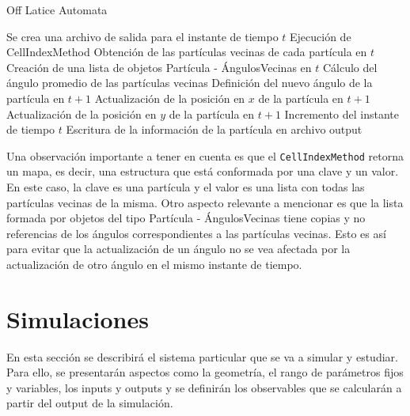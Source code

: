 \documentclass[11pt]{article}
\begin{document}
            \begin{algorithm}
                \caption{Off Latice Automata}
                \begin{algorithmic}[1]
                    \State Se crea una archivo de salida para el instante de tiempo $t$
                            \State Ejecución de CellIndexMethod
                            \State Obtención de las partículas vecinas de cada partícula en $t$
                            \State Creación de una lista de objetos Partícula - ÁngulosVecinas en $t$
                                \State Cálculo del ángulo promedio de las partículas vecinas
                                \State Definición del nuevo ángulo de la partícula en $t+1$
                                \State Actualización de la posición en $x$ de la partícula en $t+1$
                                \State Actualización de la posición en $y$ de la partícula en $t+1$
                                \State Incremento del instante de tiempo $t$
                                \State Escritura de la información de la partícula en archivo output
                            \EndWhile
                        \EndWhile
                \end{algorithmic}
            \end{algorithm}

            Una observación importante a tener en cuenta es que el \texttt{CellIndexMethod} retorna un mapa, es decir, una estructura
            que está conformada por una clave y un valor. En este caso, la clave es una partícula y el valor es una lista con todas
            las partículas vecinas de la misma.
            Otro aspecto relevante a mencionar es que la lista formada por objetos del tipo Partícula - ÁngulosVecinas
            tiene copias y no referencias de los ángulos correspondientes a las partículas vecinas. Esto es así para evitar que la actualización de un
            ángulo no se vea afectada por la actualización de otro ángulo en el mismo instante de tiempo.

    \newpage

    \section{Simulaciones}

        En esta sección se describirá el sistema particular que se va a simular y estudiar. Para ello, se
        presentarán aspectos como la geometría, el rango de parámetros fijos y variables, los inputs y outputs
        y se definirán los observables que se calcularán a partir del output de la simulación.
\end{document}
